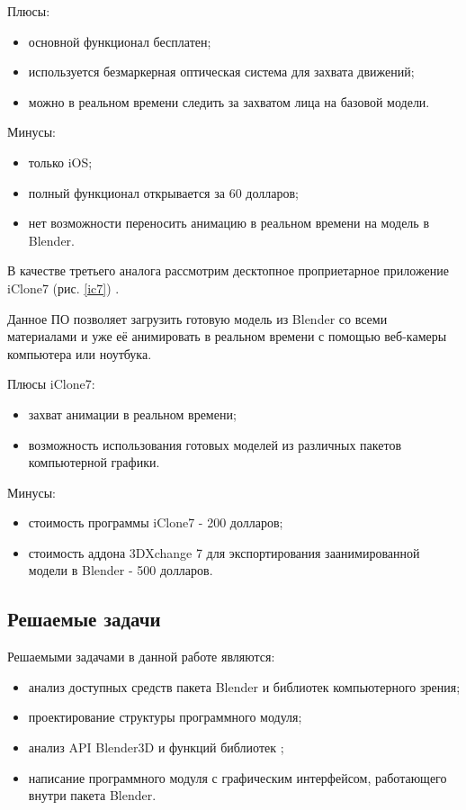 Плюсы:
\begin{itemize}
	\item основной функционал бесплатен;
	\item используется безмаркерная оптическая система для захвата движений;
	\item можно в реальном времени следить за захватом лица на базовой модели.
\end{itemize}

Минусы:
\begin{itemize}
	\item только iOS;
	\item полный функционал открывается за 60 долларов;
	\item нет возможности переносить анимацию в реальном времени на модель в Blender.
\end{itemize}

В качестве третьего аналога рассмотрим десктопное проприетарное приложение iClone7 (рис. \ref{ic7}) \cite{iclone}.


Данное ПО позволяет загрузить готовую модель из Blender со всеми материалами и уже её анимировать в реальном времени с помощью веб-камеры компьютера или ноутбука.

Плюсы iClone7:
\begin{itemize}
	\item захват анимации в реальном времени;
	\item возможность использования готовых моделей из различных пакетов компьютерной графики.
\end{itemize}
Минусы:
\begin{itemize}
	\item стоимость программы iClone7 - 200 долларов;
	\item стоимость аддона 3DXchange 7 для экспортирования заанимированной модели в Blender - 500 долларов.
\end{itemize}


\subsection{Решаемые задачи}


Решаемыми задачами в данной работе являются:
\begin{itemize}
	\item анализ доступных средств пакета Blender и библиотек компьютерного зрения;
	\item проектирование структуры программного модуля;
	\item анализ API Blender3D и функций библиотек ;
	\item написание программного модуля с графическим интерфейсом, работающего внутри пакета Blender.
\end{itemize}


\clearpage
